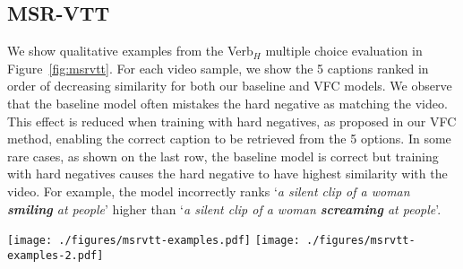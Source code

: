\subsection{MSR-VTT}\label{sec:app:msr-vtt}
We show qualitative examples from the Verb$_{H}$ \cite{park-etal-2022-exposing} multiple choice evaluation in Figure~\ref{fig:msrvtt}. For each video sample, we show the 5 captions ranked in order of decreasing similarity for both our baseline and VFC models. We observe that the baseline model often mistakes the hard negative as matching the video. This effect is reduced when training with hard negatives, as proposed in our VFC method, enabling the correct caption to be retrieved from the 5 options. In some rare cases, as shown on the last row, the baseline model is correct but training with hard negatives causes the hard negative to have highest similarity with the video. For example, the model incorrectly ranks `\textit{a silent clip of a woman \textbf{smiling} at people}' higher than `\textit{a silent clip of a woman \textbf{screaming} at people}'.

\clearpage

\begin{figure*}[!ht]
    \centering
    \texttt{[image: ./figures/msrvtt-examples.pdf]}
     \texttt{[image: ./figures/msrvtt-examples-2.pdf]}
    \caption{\textbf{MSR-VTT verb-focused benchmark:} We show qualitative examples from the Verb$_{H}$ \cite{park-etal-2022-exposing} multiple choice evaluation. For ease of visualisation, we only show a single frame per video. For each video sample, we show the 5 captions ranked in order of decreasing similarity for both our baseline and VFC models. We observe that the baseline model often mistakes the hard negative as matching the video; for example in the top left example, the caption `a deer is rolling across a road in a video game' is ranked higher than the correct answer `a deer is running across a road in a video game'. When training with hard negatives as in our VFC model, the model performance improves, retrieving the correct caption from the 5 options. On the bottom row, we show two failure cases where training with hard negatives causes the model to make a mistake; choosing the hard negative (`a group of people dancing at the camera', `a silent clip of a woman smiling at people') as the correct caption instead of (`a group of people yelling at the camera', `a silent clip of a woman screaming at people').}
    \label{fig:msrvtt}
\end{figure*}


